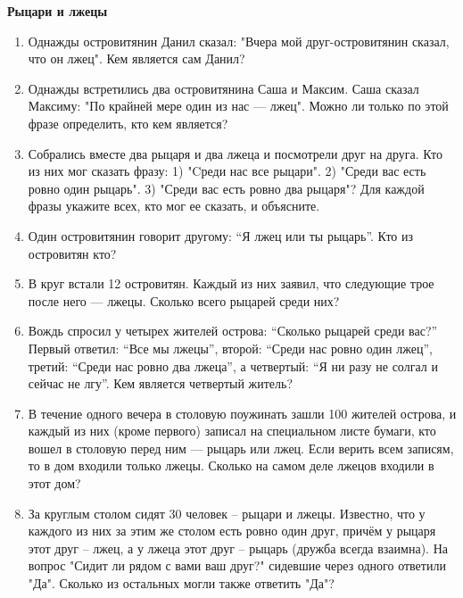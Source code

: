 \documentclass{article}
\begin{document}
\large
	
	\begin{center}
		\textbf{Рыцари и лжецы}
	\end{center}
\begin{enumerate}[label*=\protect\fbox{\arabic{enumi}}]
	\item Однажды островитянин Данил сказал: "Вчера мой друг-островитянин сказал, что он лжец". Кем является сам Данил?
	
	\item Однажды встретились два островитянина Саша и Максим. Саша сказал Максиму: "По крайней мере один из нас — лжец". Можно ли только по этой фразе определить, кто кем является?
	
	\item Собрались вместе два рыцаря и два лжеца и посмотрели друг на друга. Кто из них мог сказать фразу: 1) "Cреди нас все рыцари". 2) "Среди вас есть ровно один рыцарь". 3) "Среди вас есть ровно два рыцаря"? Для каждой фразы укажите всех, кто мог ее сказать, и объясните.
	
	\item Один островитянин говорит другому: “Я лжец или ты рыцарь”. Кто из островитян кто?
	
	\item В круг встали 12 островитян. Каждый из них заявил, что следующие трое после него — лжецы. Сколько всего рыцарей среди них?
	
	\item Вождь спросил у четырех жителей острова: “Сколько рыцарей среди вас?” Первый ответил: “Все мы лжецы”, второй: “Среди нас ровно один лжец”, третий: “Среди нас ровно два лжеца”, а четвертый: “Я ни разу не солгал и сейчас не лгу”. Кем является четвертый житель?
	
	\item  В течение одного вечера в столовую поужинать зашли 100 жителей острова, и каждый из них (кроме первого) записал на специальном листе бумаги, кто вошел в столовую перед ним — рыцарь или лжец. Если верить всем записям, то в дом входили только лжецы. Сколько на самом деле лжецов входили в этот дом?
	
	\item За круглым столом сидят 30 человек – рыцари и лжецы. Известно, что у каждого из них за этим же столом есть ровно один друг, причём у рыцаря этот друг – лжец, а у лжеца этот друг – рыцарь (дружба всегда взаимна). На вопрос "Сидит ли рядом с вами ваш друг?" сидевшие через одного ответили "Да". Сколько из остальных могли также ответить "Да"?
	

\end{enumerate}
\end{document}
